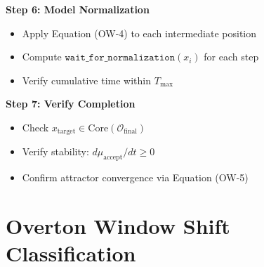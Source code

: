 \begin{tcolorbox}[colback=yellow!5!white,colframe=yellow!75!black,title=\textbf{Construction Algorithm},breakable]
\textbf{Step 6: Model Normalization}
\begin{itemize}
    \item Apply Equation (OW-4) to each intermediate position
    \item Compute $\mathtt{wait\_for\_normalization}(x_i)$ for each step
    \item Verify cumulative time within $T_{\max}$
\end{itemize}

\textbf{Step 7: Verify Completion}
\begin{itemize}
    \item Check $x_{\mathrm{target}} \in \mathrm{Core}(\mathcal{O}_{\mathrm{final}})$
    \item Verify stability: $d\mu_{\mathrm{accept}}/dt \geq 0$
    \item Confirm attractor convergence via Equation (OW-5)
\end{itemize}

\end{tcolorbox}

\section{Overton Window Shift Classification}
\label{sec:overton-classification}

